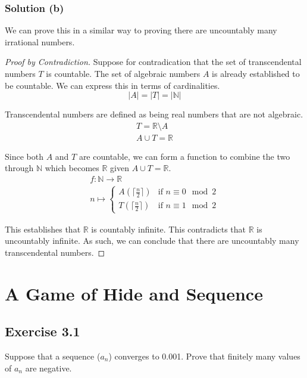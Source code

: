 \documentclass[12pt]{report}
\begin{document}
\subsection{Solution (b)}
We can prove this in a similar way to proving there are uncountably many irrational numbers.
\begin{proof}[Proof by Contradiction]
    Suppose for contradication that the set of transcendental numbers $T$ is countable.
    The set of algebraic numbers $A$ is already established to be countable.
    We can express this in terms of cardinalities.
    \begin{equation}
        |A| = |T| = |\mathbb{N}|
    \end{equation}

    Transcendental numbers are defined as being real numbers that are not algebraic.
    \begin{gather}
        T = \mathbb{R} \setminus A\\
        A \cup T = \mathbb{R}
    \end{gather}

    Since both $A$ and $T$ are countable, we can form a function to combine the two through $\mathbb{N}$ which becomes $\mathbb{R}$ given $A \cup T = \mathbb{R}$.
    \begin{gather}
        f: \mathbb{N} \to \mathbb{R}\\
        n \mapsto \begin{cases}
            A(\lceil\frac{n}{2}\rceil) &\text{if } n \equiv 0 \mod 2\\
            T(\lceil\frac{n}{2}\rceil) &\text{if } n \equiv 1 \mod 2
        \end{cases}
    \end{gather}

    This establishes that $\mathbb{R}$ is countably infinite. 
    This contradicts that $\mathbb{R}$ is uncountably infinite.
    As such, we can conclude that there are uncountably many transcendental numbers.
\end{proof}

\pagebreak
\chapter{A Game of Hide and Sequence}

\section{Exercise 3.1}
Suppose that a sequence ($a_n$) converges to 0.001. Prove that finitely many values of $a_n$ are negative. 
\end{document}
